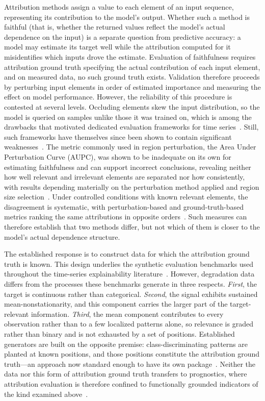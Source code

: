 \documentclass{article}
\begin{document}
Attribution methods assign a value to each element of an input sequence, representing its contribution to the model's output. Whether such a method is faithful (that is, whether the returned values reflect the model's actual dependence on the input) is a separate question from predictive accuracy: a model may estimate its target well while the attribution computed for it misidentifies which inputs drove the estimate. Evaluation of faithfulness requires attribution ground truth specifying the actual contribution of each input element, and on measured data, no such ground truth exists. Validation therefore proceeds by perturbing input elements in order of estimated importance and measuring the effect on model performance. However, the reliability of this procedure is contested at several levels. Occluding elements skew the input distribution, so the model is queried on samples unlike those it was trained on, which is among the drawbacks that motivated dedicated evaluation frameworks for time series~\cite{turbe2023}. Still, such frameworks have themselves since been shown to contain significant weaknesses~\cite{serramazza2024}. The metric commonly used in region perturbation, the Area Under Perturbation Curve (AUPC), was shown to be inadequate on its own for estimating faithfulness and can support incorrect conclusions, revealing neither how well relevant and irrelevant elements are separated nor how consistently, with results depending materially on the perturbation method applied and region size selection~\cite{simic2025}. Under controlled conditions with known relevant elements, the disagreement is systematic, with perturbation-based and ground-truth-based metrics ranking the same attributions in opposite orders~\cite{baer2026}. Such measures can therefore establish that two methods differ, but not which of them is closer to the model's actual dependence structure.
 
The established response is to construct data for which the attribution ground truth is known. This design underlies the synthetic evaluation benchmarks used throughout the time-series explainability literature~\cite{ismail2020,tonekaboni2020,queen2023}. However, degradation data differs from the processes these benchmarks generate in three respects. \textit{First}, the target is continuous rather than categorical. \textit{Second}, the signal exhibits sustained mean-nonstationarity, and this component carries the larger part of the target-relevant information. \textit{Third}, the mean component contributes to every observation rather than to a few localized patterns alone, so relevance is graded rather than binary and is not exhausted by a set of positions. Established generators are built on the opposite premise: class-discriminating patterns are planted at known positions, and those positions constitute the attribution ground truth—an approach now standard enough to have its own package~\cite{xaitimesynth2026}. Neither the data nor this form of attribution ground truth transfers to prognostics, where attribution evaluation is therefore confined to functionally grounded indicators of the kind examined above~\cite{xairul2026}.
 
\end{document}
